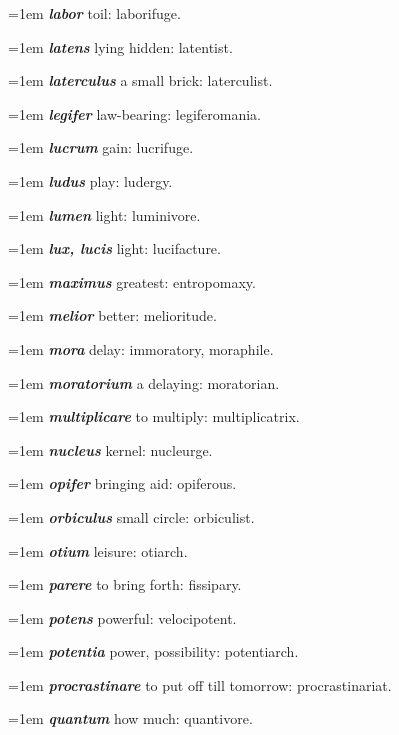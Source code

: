\hangindent=1em \textbf{\textit{labor}} toil: laborifuge.\par
\hangindent=1em \textbf{\textit{latens}} lying hidden: latentist.\par
\hangindent=1em \textbf{\textit{laterculus}} a small brick: laterculist.\par
\hangindent=1em \textbf{\textit{legifer}} law-bearing: legiferomania.\par
\hangindent=1em \textbf{\textit{lucrum}} gain: lucrifuge.\par
\hangindent=1em \textbf{\textit{ludus}} play: ludergy.\par
\hangindent=1em \textbf{\textit{lumen}} light: luminivore.\par
\hangindent=1em \textbf{\textit{lux, lucis}} light: lucifacture.\par
\hangindent=1em \textbf{\textit{maximus}} greatest: entropomaxy.\par
\hangindent=1em \textbf{\textit{melior}} better: melioritude.\par
\hangindent=1em \textbf{\textit{mora}} delay: immoratory, moraphile.\par
\hangindent=1em \textbf{\textit{moratorium}} a delaying: moratorian.\par
\hangindent=1em \textbf{\textit{multiplicare}} to multiply: multiplicatrix.\par
\hangindent=1em \textbf{\textit{nucleus}} kernel: nucleurge.\par
\hangindent=1em \textbf{\textit{opifer}} bringing aid: opiferous.\par
\hangindent=1em \textbf{\textit{orbiculus}} small circle: orbiculist.\par
\hangindent=1em \textbf{\textit{otium}} leisure: otiarch.\par
\hangindent=1em \textbf{\textit{parere}} to bring forth: fissipary.\par
\hangindent=1em \textbf{\textit{potens}} powerful: velocipotent.\par
\hangindent=1em \textbf{\textit{potentia}} power, possibility: potentiarch.\par
\hangindent=1em \textbf{\textit{procrastinare}} to put off till tomorrow: procrastinariat.\par
\hangindent=1em \textbf{\textit{quantum}} how much: quantivore.\par
